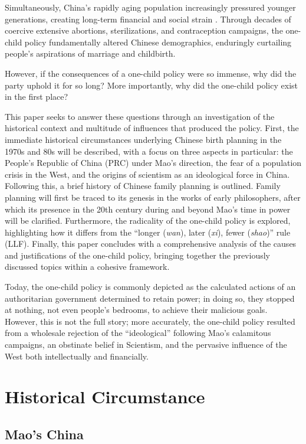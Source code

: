 \documentclass[12pt, a4paper, twoside]{article}
\begin{document}
Simultaneously, China’s rapidly aging population increasingly pressured younger generations, creating long-term financial and social strain \autocite[pp.\ 1429--1430]{JiangSanchezBarricarte2011}. Through decades of coercive extensive abortions, sterilizations, and contraception campaigns, the one-child policy fundamentally altered Chinese demographics, enduringly curtailing people’s aspirations of marriage and childbirth.

However, if the consequences of a one-child policy were so immense, why did the party uphold it for so long? More importantly, why did the one-child policy exist in the first place?

This paper seeks to answer these questions through an investigation of the historical context and multitude of influences that produced the policy. First, the immediate historical circumstances underlying Chinese birth planning in the 1970s and 80s will be described, with a focus on three aspects in particular: the People’s Republic of China (PRC) under Mao’s direction, the fear of a population crisis in the West, and the origins of scientism as an ideological force in China. Following this, a brief history of Chinese family planning is outlined. Family planning will first be traced to its genesis in the works of early philosophers, after which its presence in the 20th century during and beyond Mao’s time in power will be clarified. Furthermore, the radicality of the one-child policy is explored, highlighting how it differs from the “longer (\emph{wan}), later (\emph{xi}), fewer (\emph{shao})” rule (LLF). Finally, this paper concludes with a comprehensive analysis of the causes and justifications of the one-child policy, bringing together the previously discussed topics within a cohesive framework. 

Today, the one-child policy is commonly depicted as the calculated actions of an authoritarian government determined to retain power; in doing so, they stopped at nothing, not even people’s bedrooms, to achieve their malicious goals. However, this is not the full story; more accurately, the one-child policy resulted from a wholesale rejection of the “ideological” following Mao’s calamitous campaigns, an obstinate belief in Scientism, and the pervasive influence of the West both intellectually and financially.

\section{Historical Circumstance}
\subsection{Mao's China}
\end{document}
